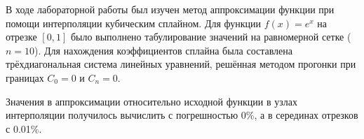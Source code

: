 В ходе лабораторной работы был изучен метод аппроксимации функции при помощи интерполяции кубическим сплайном. Для функции $f(x)=e^x$ на отрезке $[0,1]$ было выполнено табулирование значений на равномерной сетке ($n=10$). Для нахождения коэффициентов сплайна была составлена трёхдиагональная система линейных уравнений, решённая методом прогонки при границах $C_0=0$ и $C_n=0$.

Значения в аппроксимации относительно исходной функции в узлах интерполяции получилось вычислить с погрешностью 0\%, а в серединах отрезков с 0.01\%.
